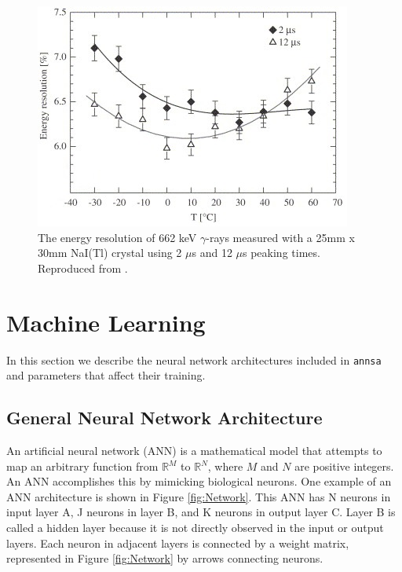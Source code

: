 \begin{figure}[H]
\centering
\includegraphics[width=0.95\linewidth]{images/temp-dependence-resolution-moszynski}
\caption{The energy resolution of 662 keV $\gamma$-rays measured with a 25mm x 30mm NaI(Tl) crystal using 2 $\mu$s and 12 $\mu$s peaking times. Reproduced from \cite{MOSZYNSKI2006739}.}
\label{fig:temp-dependence-resolution-moszynski}
\end{figure}

\section{Machine Learning}

In this section we describe the neural network architectures included in \verb|annsa| and parameters that affect their training.

\subsection{General Neural Network Architecture}

An artificial neural network (ANN) is a mathematical model that attempts to map an arbitrary function from $\mathbb{R}{^M}$ to $\mathbb{R}{^N}$, where $M$ and $N$ are positive integers. An ANN accomplishes this by mimicking biological neurons. One example of an ANN architecture is shown in Figure \ref{fig:Network}. This ANN has N neurons in input layer A, J neurons in layer B, and K neurons in output layer C. Layer B is called a hidden layer because it is not directly observed in the input or output layers. Each neuron in adjacent layers is connected by a weight matrix, represented in Figure \ref{fig:Network} by arrows connecting neurons.



